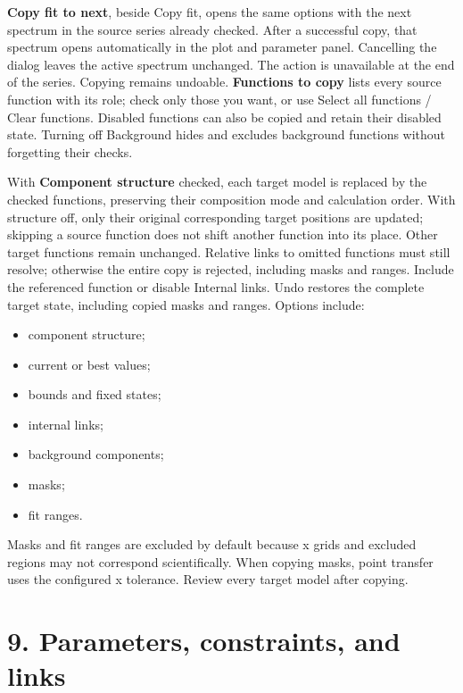 \documentclass[
  10pt,
  a4paper,
  oneside]{scrreprt}
\providecommand{\tightlist}{%
  \setlength{\itemsep}{0pt}\setlength{\parskip}{0pt}}
\begin{document}
\textbf{Copy fit to next}, beside Copy fit, opens the same options with
the next spectrum in the source series already checked. After a
successful copy, that spectrum opens automatically in the plot and
parameter panel. Cancelling the dialog leaves the active spectrum
unchanged. The action is unavailable at the end of the series. Copying
remains undoable. \textbf{Functions to copy} lists every source function
with its role; check only those you want, or use Select all functions /
Clear functions. Disabled functions can also be copied and retain their
disabled state. Turning off Background hides and excludes background
functions without forgetting their checks.

With \textbf{Component structure} checked, each target model is replaced
by the checked functions, preserving their composition mode and
calculation order. With structure off, only their original corresponding
target positions are updated; skipping a source function does not shift
another function into its place. Other target functions remain
unchanged. Relative links to omitted functions must still resolve;
otherwise the entire copy is rejected, including masks and ranges.
Include the referenced function or disable Internal links. Undo restores
the complete target state, including copied masks and ranges. Options
include:

\begin{itemize}
\tightlist
\item
  component structure;
\item
  current or best values;
\item
  bounds and fixed states;
\item
  internal links;
\item
  background components;
\item
  masks;
\item
  fit ranges.
\end{itemize}

Masks and fit ranges are excluded by default because x grids and
excluded regions may not correspond scientifically. When copying masks,
point transfer uses the configured x tolerance. Review every target
model after copying.

\hypertarget{parameters-constraints-and-links}{%
\chapter{9. Parameters, constraints, and
links}\label{parameters-constraints-and-links}}
\end{document}
